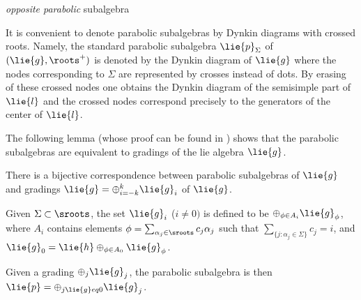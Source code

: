 \emph{opposite parabolic} subalgebra %

It is convenient to denote parabolic subalgebras by Dynkin diagrams with crossed roots. Namely, the standard parabolic subalgebra $\lie{p}_\Sigma$ of $(\lie{g},\roots^+)$ is denoted by the Dynkin diagram of $\lie{g}$ where the nodes corresponding to $\Sigma$ are represented by crosses instead of dots. By erasing of these crossed nodes one obtains the Dynkin diagram of the semisimple part of $\lie{l}$ and the crossed nodes correspond precisely to the generators of the center of $\lie{l}$.

The following lemma (whose proof can be found in \cite{cap_parabolic_2009}) shows that the parabolic subalgebras are equivalent to gradings of the lie algebra $\lie{g}$.
\begin{lemma}
There is a bijective correspondence between parabolic subalgebras of $\lie{g}$ and gradings $\lie{g}=\oplus_{i=-k}^k \lie{g}_i$ of $\lie{g}$.

	Given $\Sigma\subset\sroots$, the set $\lie{g}_i$ ($i\neq 0)$ is defined to be $\oplus_{\phi\in A_i} \lie{g}_\phi$, where $A_i$ contains elements $\phi=\sum_{\alpha_j\in\sroots} c_j \alpha_j$ such that $\sum_{\{j:\alpha_j\in\Sigma\}} c_j=i$, and $\lie{g}_0=\lie{h}\oplus_{\phi\in A_0} \lie{g}_\phi$.

	Given a grading $\oplus_j \lie{g}_j$, the parabolic subalgebra is then $\lie{p}=\oplus_{j\lie{g}eq 0}\lie{g}_j$.
\end{lemma}

